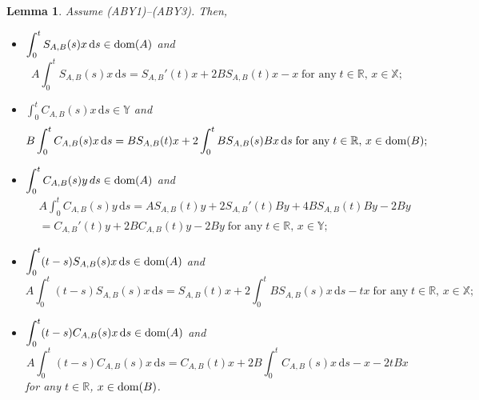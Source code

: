\documentclass[11pt]{amsart}
\numberwithin{equation}{section}
\newcommand{\SAB}{S_{A,B}}
\newcommand{\CAB}{C_{A,B}}
\newcommand{\RR}{{\mathbb R}}
\newcommand{\rmd}{{\mathrm{d}}}
\newtheorem{lemma}[theorem]{Lemma}
\theoremstyle{remark}
\theoremstyle{definition}
\newcommand\bX{{\mathbb X}}
\newcommand\bY{{\mathbb Y}}
\newcommand{\dom}{\text{\rm{dom}}}
\begin{document}
\begin{lemma}\label{l4.7}
	Assume \textnormal{(ABY1)--(ABY3)}. Then,
	\begin{itemize}
		\item[(i)] $\displaystyle\int_0^t \SAB(s)x \, \rmd s \in \dom(A)$ and
		\begin{equation}\label{A-int-SAB}
			A \int_0^t \SAB(s)x \, \rmd s = \SAB'(t)x + 2B\SAB(t)x-x\;\mbox{for any}\;t\in\RR,\,x\in\bX;
		\end{equation}
		\item[(ii)] $\displaystyle\int_0^t \CAB(s)x \, \rmd s \in \bY$ and
		\begin{equation}\label{B-int-CAB}
			B\int_0^t \CAB(s)x \, \rmd s = B\SAB(t)x + 2\int_0^t B\SAB(s)Bx \, \rmd s\;\mbox{for any}\;t\in\RR,\,x\in\dom(B);
		\end{equation}
		\item[(iii)] $\displaystyle\int_0^t \CAB(s)y \, ds \in \dom(A)$ and
		\begin{align}\label{B-int-CAB-caseY}
			&A\int_0^t \CAB(s)y \, \rmd s=A\SAB(t)y+2\SAB'(t)By+4B\SAB(t)By-2By\nonumber\\
			&= \CAB'(t)y + 2BC_{A,B}(t)y -2By \;\mbox{for any}\;t\in\RR,\,x\in\bY;
		\end{align}
		\item[(iv)] $\displaystyle\int_0^t (t-s)\SAB(s)x \, \rmd s \in \dom(A)$ and
		\begin{equation}\label{A-int-t-SAB}
			A\int_0^t (t-s)\SAB(s)x \, \rmd s = \SAB(t)x + 2\int_0^t B\SAB(s)x \, \rmd s - tx\;\mbox{for any}\;t\in\RR,\,x\in\bX;
		\end{equation}
		\item[(v)] $\displaystyle\int_0^t (t-s)\CAB(s)x \, \rmd s \in \dom(A)$ and
		\begin{equation}\label{A-int-t-CAB}
			A\int_0^t (t-s)\CAB(s)x \, \rmd s = \CAB(t)x + 2B\int_0^t \CAB(s)x \, \rmd s - x - 2tBx
		\end{equation}
		for any $t \in \mathbb{R}$, $x \in \dom(B)$.
	\end{itemize}
\end{lemma}
\end{document}
